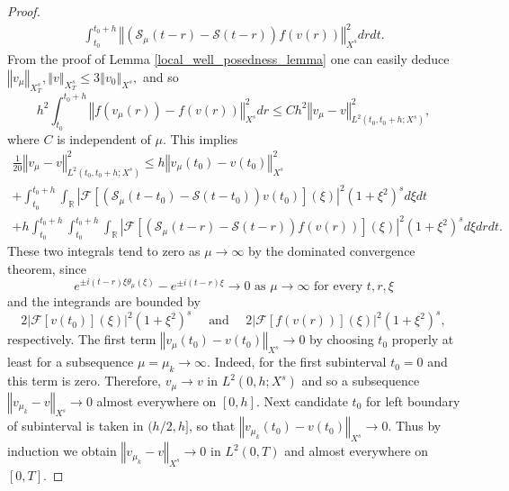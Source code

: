 \documentclass[10pt,a4paper]{amsart}
\newcommand{\Abs}[1]{\left\vert #1 \right\vert}
\newcommand{\norm}[1]{\left\Vert #1 \right\Vert}
\begin{document}
\begin{proof}
\begin{multline*}
    \int_{t_0}^{t_0 + h}
    \norm{
        \left(
            \mathcal S_{\mu}(t - r)
            -
            \mathcal S(t - r)
    	\right)
         f(v(r))
	}_{X^s}^2
    dr dt
    .
\end{multline*}
%
From the proof of Lemma \ref{local_well_posedness_lemma} one can easily deduce
\(
	\norm{
        v_{\mu}
    }_{X_T^s}
    ,
	\norm{
    	v
    }_{X_T^s}
    \leqslant
	3
    \norm{
        v_0
    }_{X^s}
    ,
\)
and so
\[
    h^2
    \int_{t_0}^{t_0 + h}
    \norm{
        f(v_{\mu}(r))
        -
        f(v(r))
	}_{X^s}^2
    dr
    \leqslant
    C h^2
	\norm{
        v_{\mu}
        -
    	v
    }_{ L^2(t_0, t_0 + h; X^s) }^2
    ,
\]
where $C$ is independent of $\mu$.
This implies
%
\begin{multline*}
    \frac 1{20}
	\norm{
        v_{\mu}
        -
    	v
    }_{ L^2(t_0, t_0 + h; X^s) }^2
    \leqslant
    h
	\norm{
        v_{\mu}(t_0)
        -
    	v(t_0)
    }_{X^s}^2
    \\
    +
    \int_{t_0}^{t_0 + h}
    \int_{\mathbb R}
    \Abs{
        \mathcal F
        \left[
            \left(
                \mathcal S_{\mu}(t - t_0)
                -
                \mathcal S(t - t_0)
            \right)
            v(t_0)
        \right]
        (\xi)
	}^2
    \left( 1 + \xi^2 \right)^s
    d \xi
    dt
	\\
    +
    h
    \int_{t_0}^{t_0 + h}
    \int_{t_0}^{t_0 + h}
    \int_{\mathbb R}
    \Abs{
        \mathcal F
        \left[
            \left(
                \mathcal S_{\mu}(t - r)
                -
                \mathcal S(t - r)
        	\right)
             f(v(r))
        \right]
        (\xi)
	}^2
    \left( 1 + \xi^2 \right)^s
    d \xi
    dr dt
    .
\end{multline*}
%
These two integrals tend to zero as $\mu \to \infty$ by the dominated convergence theorem,
since
\[
    e^{ \pm i (t - r) \xi \theta_{\mu}(\xi) }
    -
    e^{ \pm i (t - r) \xi }
    \to
    0
    \text{ as }
    \mu \to \infty
    \text{ for every }
    t, r, \xi
\]
and the integrands are bounded by
\[
    2
    \Abs{
        \mathcal F
        \left[
            v(t_0)
        \right]
        (\xi)
	}^2
    \left( 1 + \xi^2 \right)^s
    \quad
    \text{ and }
    \quad
    2
    \Abs{
        \mathcal F
        \left[
             f(v(r))
        \right]
        (\xi)
	}^2
    \left( 1 + \xi^2 \right)^s
    ,
\]
%
respectively.
The first term
\(
	\norm{
        v_{\mu}(t_0)
        -
    	v(t_0)
    }_{X^s}
    \to
    0
\)
by choosing $t_0$ properly at least for a subsequence $\mu = \mu_k \to \infty$.
Indeed, for the first subinterval $t_0 = 0$ and this term is zero.
Therefore,
\(
    v_{\mu} \to v
\)
in
\(
    L^2(0, h; X^s)
\)
and so a subsequence
\(
    \norm{v_{\mu_k} - v}_{X^s}
    \to
    0
\)
almost everywhere on $[0, h]$.
Next candidate $t_0$ for left boundary of subinterval is taken in $(h/2 ,h]$,
so that
\(
    \norm{v_{\mu_k}(t_0) - v(t_0)}_{X^s}
    \to
    0
    .
\)
Thus by induction we obtain
\(
    \norm{v_{\mu_k} - v}_{X^s}
    \to
    0
\)
in $L^2(0, T)$
and almost everywhere on $[0, T]$.



\end{proof}
\end{document}

